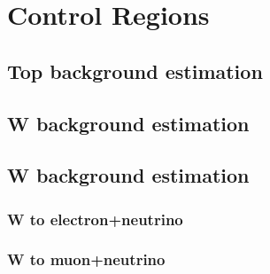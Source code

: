 \section{Control Regions}


\subsection{Top background estimation}


\subsection{W background estimation}


\subsection{W background estimation}


\subsubsection{W to electron+neutrino}


\subsubsection{W to muon+neutrino}

